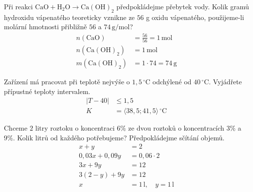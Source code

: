 \documentclass[11pt,a4paper]{article}
\begin{document}
\begin{zadaniReseniBox}[title={Samostatná práce 1}]
Při reakci $\mathrm{CaO+H_2O\rightarrow Ca(OH)_2}$ předpokládejme přebytek vody. Kolik gramů hydroxidu vápenatého teoreticky vznikne ze $56$ g oxidu vápenatého, použijeme-li molární hmotnosti přibližně $56$ a $74\,\mathrm{g/mol}$?
\tcblower
\[
\begin{aligned}
n(\mathrm{CaO})&=\frac{56}{56}=1\,\mathrm{mol}\\
n(\mathrm{Ca(OH)_2})&=1\,\mathrm{mol}\\
m(\mathrm{Ca(OH)_2})&=1\cdot74=74\,\mathrm g
\end{aligned}
\]

\end{zadaniReseniBox}
\begin{zadaniReseniBox}[title={Samostatná práce 2}]
Zařízení má pracovat při teplotě nejvýše o $1{,}5\,^{\circ}\mathrm C$ odchýlené od $40\,^{\circ}\mathrm C$. Vyjádřete přípustné teploty intervalem.
\tcblower
\[
\begin{aligned}
|T-40|&\le1{,}5\\
K&=\langle38{,}5;41{,}5\rangle\,^{\circ}\mathrm C
\end{aligned}
\]

\end{zadaniReseniBox}
\begin{zadaniReseniBox}[title={Samostatná práce 3}]
Chceme $2$ litry roztoku o koncentraci $6\%$ ze dvou roztoků o koncentracích $3\%$ a $9\%$. Kolik litrů od každého potřebujeme? Předpokládejme sčítání objemů.
\tcblower
\[
\begin{aligned}
x+y&=2\\
0{,}03x+0{,}09y&=0{,}06\cdot2\\
3x+9y&=12\\
3(2-y)+9y&=12\\
x&=1\,\mathrm l,\quad y=1\,\mathrm l
\end{aligned}
\]

\end{zadaniReseniBox}
\end{document}
